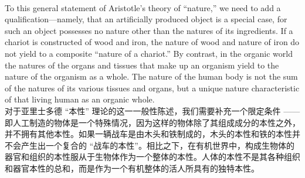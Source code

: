 \documentclass{article}
\begin{document}
\\
To this general statement of Aristotle’s theory of “nature,” we need to add a qualification—namely, that an artificially produced object is a special case, for such an object possesses no nature other than the natures of its ingredients. If a chariot is constructed of wood and iron, the nature of wood and nature of iron do not yield to a composite “nature of a chariot.” By contrast, in the organic world the natures of the organs and tissues that make up an organism yield to the nature of the organism as a whole. The nature of the human body is not the sum of the natures of its various tissues and organs, but a unique nature characteristic of that living human as an organic whole.\\
对于亚里士多德 “本性” 理论的这一一般性陈述，我们需要补充一个限定条件 —— 即人工制造的物体是一个特殊情况，因为这样的物体除了其组成成分的本性之外，并不拥有其他本性。如果一辆战车是由木头和铁制成的，木头的本性和铁的本性并不会产生出一个复合的 “战车的本性”。相比之下，在有机世界中，构成生物体的器官和组织的本性服从于生物体作为一个整体的本性。人体的本性不是其各种组织和器官本性的总和，而是作为一个有机整体的活人所具有的独特本性。\\
\end{document}
